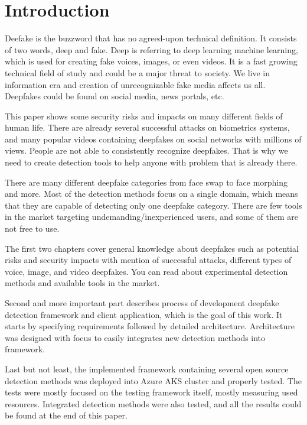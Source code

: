 \chapter{Introduction}

Deefake is the buzzword that has no agreed-upon technical definition. It consists of two words, deep and fake. Deep is referring to deep learning machine learning, which is used for creating fake voices, images, or even videos. It is a fast growing technical field of study and could be a major threat to society. We live in information era and creation of unrecognizable fake media affects us all. Deepfakes could be found on social media, news portals, etc.

This paper shows some security risks and impacts on many different fields of human life. There are already several successful attacks on biometrics systems, and many popular videos containing deepfakes on social networks with millions of views. People are not able to consistently recognize deepfakes. That is why we need to create detection tools to help anyone with problem that is already there.

There are many different deepfake categories from face swap to face morphing and more. Most of the detection methods focus on a single domain, which means that they are capable of detecting only one deepfake category. There are few tools in the market targeting undemanding/inexperienced users, and some of them are not free to use.

The first two chapters cover general knowledge about deepfakes such as potential risks and security impacts with mention of successful attacks, different types of voice, image, and video deepfakes. You can read about experimental detection methods and available tools in the market.

Second and more important part describes process of development deepfake detection framework and client application, which is the goal of this work. It starts by specifying requirements followed by detailed architecture. Architecture was designed with focus to easily integrates new detection methods into framework.

Last but not least, the implemented framework containing several open source detection methods was deployed into Azure AKS cluster and properly tested. The tests were mostly focused on the testing framework itself, mostly measuring used resources. Integrated detection methods were also tested, and all the results could be found at the end of this paper.

